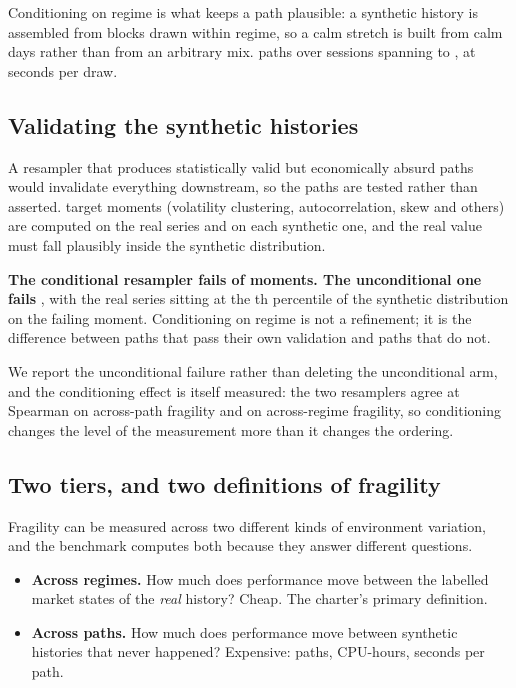 \documentclass[11pt,a4paper]{article}
\begin{document}
Conditioning on regime is what keeps a path plausible: a synthetic history is assembled from blocks
drawn within regime, so a calm stretch is built from calm days rather than from an arbitrary mix.
\rsCrrPaths{} paths over \rsCrrSessions{} sessions spanning \rsCrrWindowStart{} to
\rsCrrWindowEnd{}, at \rsCrrDrawSeconds{} seconds per draw.

\subsection{Validating the synthetic histories}
\label{sec:validation}

A resampler that produces statistically valid but economically absurd paths would invalidate
everything downstream, so the paths are tested rather than asserted. \rsNMoments{} target moments
(volatility clustering, autocorrelation, skew and others) are computed on the real series and
on each synthetic one, and the real value must fall plausibly inside the synthetic distribution.

\begin{finding}
\textbf{The conditional resampler fails \rsMomentsFailedConditional{} of \rsNMoments{} moments. The
unconditional one fails \rsMomentsFailedUnconditional{}}, with the real series sitting at the
\rsFailingMomentPercentile{}th percentile of the synthetic distribution on the failing moment.
Conditioning on regime is not a refinement; it is the difference between paths that pass their
own validation and paths that do not.
\end{finding}

We report the unconditional failure rather than deleting the unconditional arm, and the
conditioning effect is itself measured: the two resamplers agree at Spearman
\rsConditioningEffectPaths{} on across-path fragility and \rsConditioningEffectRegimes{} on
across-regime fragility, so conditioning changes the level of the measurement more than it changes
the ordering.

\subsection{Two tiers, and two definitions of fragility}
\label{sec:definitions}

Fragility can be measured across two different kinds of environment variation, and the benchmark
computes both because they answer different questions.

\begin{itemize}
\item \textbf{Across regimes.} How much does performance move between the
  \rsRegimeK{} labelled market states of the \emph{real} history? Cheap. The charter's primary
  definition.
\item \textbf{Across paths.} How much does performance move between synthetic histories that
  never happened? Expensive: \rsTierOnePaths{} paths, \rsTierOneCpuHours{} CPU-hours,
  \rsTierOneSecondsPerPath{} seconds per path.
\end{itemize}
\end{document}

